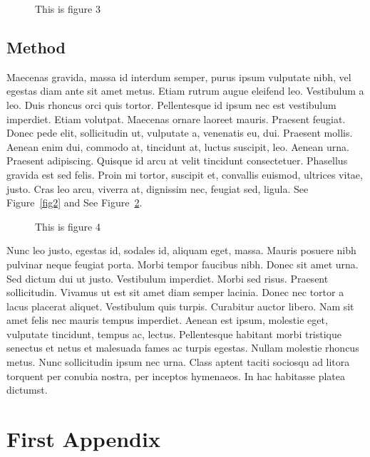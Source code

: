 \documentclass{report}
\begin{document}
\begin{figure}[h]
\begin{center}
\vspace{2cm}
\label{fig3}
\caption{This is figure 3}
\end{center}
\end{figure}

\section{Method}
Maecenas gravida, massa id interdum semper, purus ipsum vulputate nibh, vel
egestas diam ante sit amet metus. Etiam rutrum augue eleifend leo. Vestibulum a
leo. Duis rhoncus orci quis tortor. Pellentesque id ipsum nec est vestibulum
imperdiet. Etiam volutpat. Maecenas ornare laoreet mauris. Praesent feugiat.
Donec pede elit, sollicitudin ut, vulputate a, venenatis eu, dui. Praesent
mollis. Aenean enim dui, commodo at, tincidunt at, luctus suscipit, leo. Aenean
urna. Praesent adipiscing. Quisque id arcu at velit tincidunt consectetuer.
Phasellus gravida est sed felis. Proin mi tortor, suscipit et, convallis
euismod, ultrices vitae, justo. Cras leo arcu, viverra at, dignissim nec,
feugiat sed, ligula.  See Figure~\ref{fig2} and See Figure~\ref{fig4}.

\begin{figure}[h]
\begin{center}
\vspace{2cm}
\label{fig4}
\caption{This is figure 4}
\end{center}
\end{figure}

Nunc leo justo, egestas id, sodales id, aliquam eget, massa. Mauris posuere nibh
pulvinar neque feugiat porta. Morbi tempor faucibus nibh. Donec sit amet urna.
Sed dictum dui ut justo. Vestibulum imperdiet. Morbi sed risus. Praesent
sollicitudin. Vivamus ut est sit amet diam semper lacinia. Donec nec tortor a
lacus placerat aliquet. Vestibulum quis turpis. Curabitur auctor libero. Nam sit
amet felis nec mauris tempus imperdiet. Aenean est ipsum, molestie eget,
vulputate tincidunt, tempus ac, lectus. Pellentesque habitant morbi tristique
senectus et netus et malesuada fames ac turpis egestas. Nullam molestie rhoncus
metus. Nunc sollicitudin ipsum nec urna. Class aptent taciti sociosqu ad litora
torquent per conubia nostra, per inceptos hymenaeos. In hac habitasse platea
dictumst. 

\appendix

\chapter{First Appendix}
\end{document}
